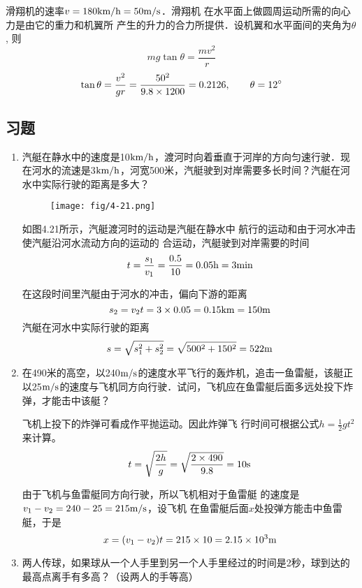 \begin{enumerate}
\begin{solution}
    滑翔机的速率$v=180\text{km}/\text{h}=50\text{m}/\text{s}$．滑翔机
    在水平面上做圆周运动所需的向心力是由它的重力和机翼所
    产生的升力的合力所提供．设机翼和水平面间的夹角为$\theta$, 则
    \[mg\tan\theta=\frac{mv^2}{r}\]
    \[\tan\theta=\frac{v^2}{gr}=\frac{50^2}{9.8\times 1200}=0.2126,\qquad \theta=12^{\circ}\]
\end{solution}
\end{enumerate}





\subsection{习题}

\begin{enumerate}
	\item 汽艇在静水中的速度是10$\text{km}/\text{h}$，渡河时向着垂直于河岸的方向匀速行驶．现在河水的流速是3$\text{km}/\text{h}$，河宽500米，汽艇驶到对岸需要多长时间？汽艇在河水中实际行驶的距离是多大？
    \begin{figure}[htp]
        \centering
        \texttt{[image: fig/4-21.png]}
        \caption{}
        \end{figure}

    \begin{solution}
如图4.21所示，汽艇渡河时的运动是汽艇在静水中
航行的运动和由于河水冲击使汽艇沿河水流动方向的运动的
合运动，汽艇驶到对岸需要的时间
\[t=\frac{s_1}{v_1}=\frac{0.5}{10}=0.05{\rm h}=3{\rm min}\]

在这段时间里汽艇由于河水的冲击，偏向下游的距离
\[s_2=v_2t=3\times0.05=0.15{\rm km }=150{\rm m}\]
汽艇在河水中实际行驶的距离
\[s=\sqrt{s_1^2+s_2^2}=\sqrt{500^2+150^2}=522{\rm m}\]    
    \end{solution}
\item 在490米的高空，以240$\text{m}/\text{s}$的速度水平飞行的轰炸机，追击一鱼雷艇，该艇正以25$\text{m}/\text{s}$的速度与飞机同方向行驶．试问，飞机应在鱼雷艇后面多远处投下炸弹，才能击中该艇？

\begin{solution}
    飞机上投下的炸弹可看成作平抛运动。因此炸弹飞
    行时间可根据公式$h=\frac{1}{2}gt^2$来计算。
\[t=\sqrt{\frac{2h}{g}}=\sqrt{\frac{2\times 490}{9.8}}=10{\rm s}\]

由于飞机与鱼雷艇同方向行驶，所以飞机相对于鱼雷艇
的速度是$v_1-v_2=240-25=215\text{m}/\text{s}$，设飞机
在鱼雷艇后面$x$处投弹方能击中鱼雷艇，于是
\[x=(v_1-v_2)t=215\times10=2.15\times10^3{\rm m}\]
\end{solution}
\item 两人传球，如果球从一个人手里到另一个人手里经过的时间是2秒，球到达的最高点离手有多高？（设两人的手等高）


\end{enumerate}
